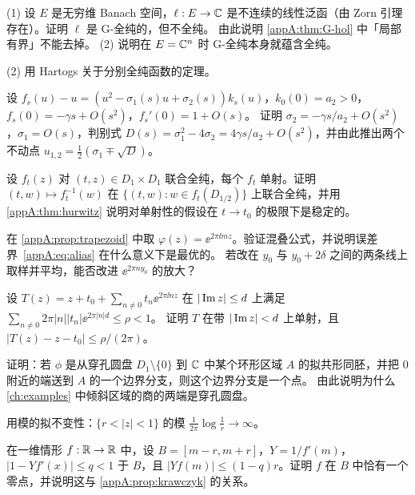 \exercises

\begin{exercise}\label{appA:ex:not-continuous}
(1) 设 $E$ 是无穷维 Banach 空间，$\ell:E\to\mathbb{C}$ 是不连续的线性泛函（由 Zorn 引理存在）。证明 $\ell$ 是 G-全纯的，但不全纯。
由此说明 \cref{appA:thm:G-hol} 中「局部有界」不能去掉。
(2) 说明在 $E=\mathbb{C}^n$ 时 G-全纯本身就蕴含全纯。
\end{exercise}
\begin{hint}
(2) 用 Hartogs 关于分别全纯函数的定理。
\end{hint}

\begin{exercise}\label{appA:ex:weierstrass-d2}
设 $f_s(u)-u=(u^2-\sigma_1(s)u+\sigma_2(s))k_s(u)$，$k_0(0)=a_2>0$，$f_s(0)=-\gamma s+O(s^2)$，$f_s'(0)=1+O(s)$。
证明 $\sigma_2=-\gamma s/a_2+O(s^2)$，$\sigma_1=O(s)$，判别式 $D(s)=\sigma_1^2-4\sigma_2=4\gamma s/a_2+O(s^2)$，并由此推出两个不动点 $u_{1,2}=\tfrac12(\sigma_1\mp\sqrt{D})$。
\end{exercise}

\begin{exercise}\label{appA:ex:hurwitz-family}
设 $f_t(z)$ 对 $(t,z)\in D_1\times D_1$ 联合全纯，每个 $f_t$ 单射。证明 $(t,w)\mapsto f_t^{-1}(w)$ 在 $\{(t,w):w\in f_t(D_{1/2})\}$ 上联合全纯，并用 \cref{appA:thm:hurwitz} 说明对单射性的假设在 $t\to t_0$ 的极限下是稳定的。
\end{exercise}

\begin{exercise}\label{appA:ex:alias-sharp}
在 \cref{appA:prop:trapezoid} 中取 $\varphi(z)=\ee^{2\pi\ii mz}$。验证混叠公式，并说明误差界~\eqref{appA:eq:alias} 在什么意义下是最优的。
若改在 $y_0$ 与 $y_0+2\delta$ 之间的两条线上取样并平均，能否改进 $\ee^{2\pi ny_0}$ 的放大？
\end{exercise}

\begin{exercise}\label{appA:ex:NW-strip}
设 $T(z)=z+t_0+\sum_{n\ne0}t_n\ee^{2\pi\ii nz}$ 在 $|\operatorname{Im} z|\le d$ 上满足 $\sum_{n\ne0}2\pi|n||t_n|\ee^{2\pi|n|d}\le\rho<1$。
证明 $T$ 在带 $|\operatorname{Im} z|<d$ 上单射，且 $|T(z)-z-t_0|\le\rho/(2\pi)$。
\end{exercise}

\begin{exercise}\label{appA:ex:modulus}
证明：若 $\phi$ 是从穿孔圆盘 $D_1\setminus\{0\}$ 到 $\mathbb{C}$ 中某个环形区域 $A$ 的拟共形同胚，并把 $0$ 附近的端送到 $A$ 的一个边界分支，则这个边界分支是一个点。
由此说明为什么 \cref{ch:examples} 中倾斜区域的商的两端是穿孔圆盘。
\end{exercise}
\begin{hint}
用模的拟不变性：$\{r<|z|<1\}$ 的模 $\frac1{2\pi}\log\frac1r\to\infty$。
\end{hint}

\begin{exercise}\label{appA:ex:krawczyk-1d}
在一维情形 $f:\mathbb{R}\to\mathbb{R}$ 中，设 $B=[m-r,m+r]$，$Y=1/f'(m)$，$|1-Yf'(x)|\le q<1$ 于 $B$，且 $|Yf(m)|\le(1-q)r$。证明 $f$ 在 $B$ 中恰有一个零点，并说明这与 \cref{appA:prop:krawczyk} 的关系。
\end{exercise}
